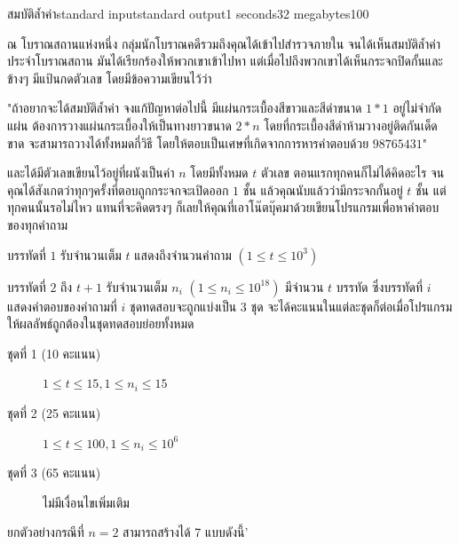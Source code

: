 \documentclass[11pt,a4paper]{article}
\begin{document}
\begin{problem}{สมบัติล้ำค่า}{standard input}{standard output}{1 seconds}{32 megabytes}{100}

ณ โบราณสถานแห่งหนึ่ง กลุ่มนักโบราณคดีรวมถึงคุณได้เข้าไปสำรวจภายใน จนได้เห็นสมบัติล้ำค่าประจำโบราณสถาน มันได้เรียกร้องให้พวกเขาเข้าไปหา แต่เมื่อไปถึงพวกเขาได้เห็นกระจกปิดกั้นและข้างๆ มีแป้นกดตัวเลข โดยมีข้อความเขียนไว้ว่า

\begin{center}
"ถ้าอยากจะได้สมบัติล้ำค่า จงแก้ปัญหาต่อไปนี้ มีแผ่นกระเบื้องสีขาวและสีดำขนาด $1*1$ อยู่ไม่จำกัดแผ่น ต้องการวางแผ่นกระเบื้องให้เป็นทางยาวขนาด $2*n$ โดยที่กระเบื้องสีดำห้ามวางอยู่ติดกันเด็ดขาด จะสามารถวางได้ทั้งหมดกี่วิธี โดยให้ตอบเป็นเศษที่เกิดจากการหารคำตอบด้วย $98765431$"
\end{center}

และได้มีตัวเลขเขียนไว้อยู่ที่ผนังเป็นค่า $n$ โดยมีทั้งหมด $t$ ตัวเลข ตอนแรกทุกคนก็ไม่ได้คิดอะไร จนคุณได้สังเกตว่าทุกๆครั้งที่ตอบถูกกระจกจะเปิดออก $1$ ชั้น แล้วคุณนับแล้วว่ามีกระจกกั้นอยู่ $t$ ชั้น แต่ทุกคนนั้นรอไม่ไหว แทนที่จะคิดตรงๆ ก็เลยให้คุณที่เอาโน๊ตบุ๊คมาด้วยเขียนโปรแกรมเพื่อหาคำตอบของทุกคำถาม 

\InputFile
บรรทัดที่ $1$ รับจำนวนเต็ม $t$ แสดงถึงจำนวนคำถาม $(1 \leq t \leq 10^3)$

บรรทัดที่ $2$ ถึง $t + 1$ รับจำนวนเต็ม $n_i$ $(1 \leq n_i \leq10^{18})$
\OutputFile
มีจำนวน $t$ บรรทัด ซึ่งบรรทัดที่ $i$ แสดงคำตอบของคำถามที่ $i$ 
\Scoring
ชุดทดสอบจะถูกแบ่งเป็น $3$ ชุด จะได้คะแนนในแต่ละชุดก็ต่อเมื่อโปรแกรมให้ผลลัพธ์ถูกต้องในชุดทดสอบย่อยทั้งหมด

\begin{description}

\item[ชุดที่ 1 (10 คะแนน)]  $1 \leq t \leq 15 , 1 \leq n_i \leq 15$ 

\item[ชุดที่ 2 (25 คะแนน)] $1 \leq t \leq 100 , 1 \leq n_i \leq 10^{6}$

\item[ชุดที่ 3 (65 คะแนน)] ไม่มีเงื่อนไขเพิ่มเติม

\end{description}

\Examples

\begin{example}
%
%
\end{example}

\Note
\begin{note}
ยกตัวอย่างกรณีที่ $n = 2$ สามารถสร้างได้ 7 แบบดังนี้'


\end{note}
\end{problem}
\end{document}

